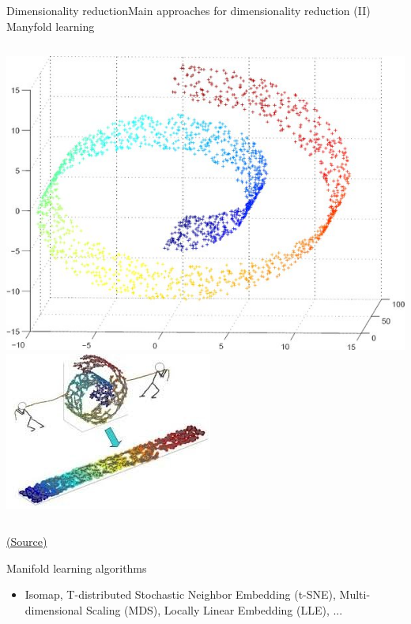 \documentclass[10pt,compress]{beamer} %
\begin{document}
\begin{frame}{Dimensionality reduction}{Main approaches for dimensionality reduction (II)}
    \centering Manyfold learning
    \begin{columns}
	    \includegraphics[width=\textwidth]{figs/manifold2.jpeg} 
	    \includegraphics[width=\textwidth]{figs/manifold.jpeg} 
    \end{columns}
	\scriptsize\href{https://www.quora.com/What-is-manifold-learning}{(Source)}
    \normalsize
    \flushleft

    Manifold learning algorithms
    \begin{itemize}
		\item Isomap, T-distributed Stochastic Neighbor Embedding (t-SNE), Multi-dimensional Scaling (MDS), Locally Linear Embedding (LLE), ...
    \end{itemize}
\end{frame}
\end{document}
